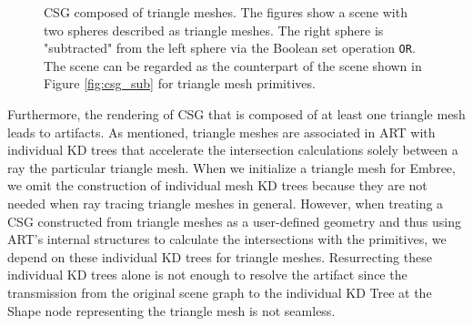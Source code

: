 \begin{figure}
	\centering
	\hfil
	\caption{CSG composed of triangle meshes. The figures show a scene with two spheres described as triangle meshes. The right sphere is "subtracted" from the left sphere via the Boolean set operation \texttt{OR}. The scene can be regarded as the counterpart of the scene shown in Figure \ref{fig:csg_sub} for triangle mesh primitives.}
	\label{fig:csg_mesh_intro}
\end{figure}

Furthermore, the rendering of CSG that is composed of at least one triangle mesh leads to artifacts. As mentioned, triangle meshes are associated in ART with individual KD trees that accelerate the intersection calculations solely between a ray the particular triangle mesh. When we initialize a triangle mesh for Embree, we omit the construction of individual mesh KD trees because they are not needed when ray tracing triangle meshes in general. However, when treating a CSG constructed from triangle meshes as a user-defined geometry and thus using ART's internal structures to calculate the intersections with the primitives, we depend on these individual KD trees for triangle meshes. Resurrecting these individual KD trees alone is not enough to resolve the artifact since the transmission from the original scene graph to the individual KD Tree at the Shape node representing the triangle mesh is not seamless.


